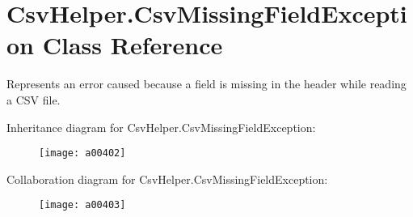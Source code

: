 \hypertarget{a00066}{\section{Csv\-Helper.\-Csv\-Missing\-Field\-Exception Class Reference}
\label{a00066}
}


Represents an error caused because a field is missing in the header while reading a C\-S\-V file.  




Inheritance diagram for Csv\-Helper.\-Csv\-Missing\-Field\-Exception\-:
\nopagebreak
\begin{figure}[H]
\begin{center}
\leavevmode
\texttt{[image: a00402]}
\end{center}
\end{figure}


Collaboration diagram for Csv\-Helper.\-Csv\-Missing\-Field\-Exception\-:
\nopagebreak
\begin{figure}[H]
\begin{center}
\leavevmode
\texttt{[image: a00403]}
\end{center}
\end{figure}
